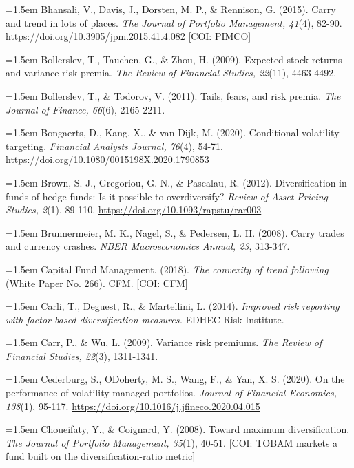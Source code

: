 \documentclass[12pt, a4paper]{article}
\begin{document}
\hangindent=1.5em
Bhansali, V., Davis, J., Dorsten, M. P., \& Rennison, G. (2015). Carry
and trend in lots of places. \emph{The Journal of Portfolio Management,
41}(4), 82-90. \url{https://doi.org/10.3905/jpm.2015.41.4.082} {[}COI:
PIMCO{]}

\hangindent=1.5em
Bollerslev, T., Tauchen, G., \& Zhou, H. (2009). Expected stock returns
and variance risk premia. \emph{The Review of Financial Studies,
22}(11), 4463-4492.

\hangindent=1.5em
Bollerslev, T., \& Todorov, V. (2011). Tails, fears, and risk premia.
\emph{The Journal of Finance, 66}(6), 2165-2211.

\hangindent=1.5em
Bongaerts, D., Kang, X., \& van Dijk, M. (2020). Conditional volatility
targeting. \emph{Financial Analysts Journal, 76}(4), 54-71.
\url{https://doi.org/10.1080/0015198X.2020.1790853}

\hangindent=1.5em
Brown, S. J., Gregoriou, G. N., \& Pascalau, R. (2012). Diversification
in funds of hedge funds: Is it possible to overdiversify? \emph{Review
of Asset Pricing Studies, 2}(1), 89-110.
\url{https://doi.org/10.1093/rapstu/rar003}

\hangindent=1.5em
Brunnermeier, M. K., Nagel, S., \& Pedersen, L. H. (2008). Carry trades
and currency crashes. \emph{NBER Macroeconomics Annual, 23}, 313-347.

\hangindent=1.5em
Capital Fund Management. (2018). \emph{The convexity of trend following}
(White Paper No. 266). CFM. {[}COI: CFM{]}

\hangindent=1.5em
Carli, T., Deguest, R., \& Martellini, L. (2014). \emph{Improved risk
reporting with factor-based diversification measures.} EDHEC-Risk
Institute.

\hangindent=1.5em
Carr, P., \& Wu, L. (2009). Variance risk premiums. \emph{The Review of
Financial Studies, 22}(3), 1311-1341.

\hangindent=1.5em
Cederburg, S., O\textquotesingle Doherty, M. S., Wang, F., \& Yan, X. S.
(2020). On the performance of volatility-managed portfolios.
\emph{Journal of Financial Economics, 138}(1), 95-117.
\url{https://doi.org/10.1016/j.jfineco.2020.04.015}

\hangindent=1.5em
Choueifaty, Y., \& Coignard, Y. (2008). Toward maximum diversification.
\emph{The Journal of Portfolio Management, 35}(1), 40-51. {[}COI: TOBAM
markets a fund built on the diversification-ratio metric{]}
\end{document}
